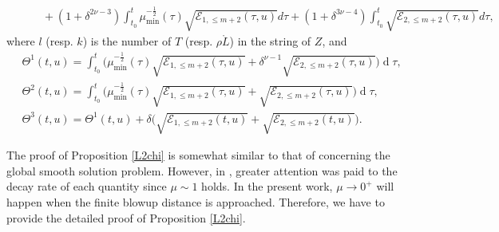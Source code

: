 \documentclass[11pt,twoside]{article}
\def\de{\delta}
\def\d{\operatorname{d}}
\def\f{\frac}
\begin{document}
\begin{proposition}
\begin{equation}
\begin{split}
 &\qquad+(1+\delta^{2\nu-3})\int_{t_0}^t\mu_{\min}^{-\f12}(\tau)\sqrt{\mathcal E_{1,\leq m+2}(\tau,u)}d\tau+(1+\delta^{3\nu-4})\int_{t_0}^t\sqrt{\mathcal E_{2,\leq m+2}(\tau,u)}d\tau,
 \end{split}
 \end{equation}
 where $l$ (resp. $k$) is the number of $T$ (resp. $\rho \mathring L$) in the string of $Z$, and
 \begin{equation*}
 \begin{split}
 &\Theta^1(t,u)=\int_{t_0}^t\big(\mu_{\min}^{-\f12}(\tau)\sqrt{\mathcal E_{1,\leq m+2}(\tau,u)}+\de^{\nu-1}\sqrt{\mathcal E_{2,\leq m+2}(\tau,u)}\big)\d\tau,\\
 &\Theta^2(t,u)=\int_{t_0}^t\big(\mu_{\min}^{-\f12}(\tau)\sqrt{\mathcal E_{1,\leq m+2}(\tau,u)}+\sqrt{\mathcal E_{2,\leq m+2}(\tau,u)}\big)\d\tau,\\
 &\Theta^3(t,u)=\Theta^1(t,u)+\delta\big(\sqrt{\mathcal E_{1,\leq m+2}(t,u)}+\sqrt{\mathcal E_{2,\leq m+2}(t,u)}\big).
 \end{split}
 \end{equation*}
\end{proposition}

\begin{remark}
 The proof of Proposition \ref{L2chi} is somewhat similar to that of \cite[Proposition 3.3]{Ding4} concerning the global smooth solution problem.
 However, in \cite{Ding4}, greater attention was paid to the decay rate of each quantity since $\mu \sim 1$ holds. In the present work,
$\mu \to 0^+$ will happen when the finite blowup distance is approached. Therefore, we have to provide the detailed proof of Proposition \ref{L2chi}.
\end{remark}
\end{document}
